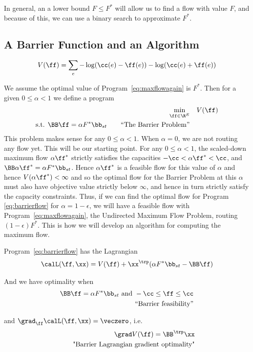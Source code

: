 In general, an a lower
bound $F \leq F^*$ will allow us to find a flow with value $F$, and
because of this, we can use a binary search to approximate $F^*$.

\subsection{A Barrier Function and an Algorithm}
\[
V(\ff) = \sum_e -\log(\cc(e)-\ff(e))  -\log(\cc(e)+\ff(e)) 
\]

We assume the optimal value of Program~\eqref{eq:maxflowagain} is $F^*$.
Then for a given $0 \leq \alpha < 1$ we define a program
\begin{align}
   \label{eq:barrierflow}
\min_{\ff \in \R^E} & \quad  V(\ff)\\
\textrm{s.t. }  \BB\ff= \alpha F^* \bb_{st}
  \tag*{``The Barrier Problem''}
\end{align}
This problem makes sense for any $0 \leq \alpha < 1$.
When $\alpha = 0$, we are not routing any flow yet. This will be our
starting point.
For any $0 \leq \alpha < 1$, the scaled-down maximum
flow $\alpha\ff^*$ strictly satisfies the capacities $ -\cc < \alpha\ff^* < \cc$, and
$\BB\alpha\ff^*= \alpha F^* \bb_{st}$.
Hence $\alpha\ff^*$ is a feasible flow for this value of $\alpha$ and 
hence $V(\alpha\ff^*) < \infty$ and so the optimal flow for the
Barrier Problem at this $\alpha$ must also have objective value
strictly below $\infty$, and hence in
turn strictly satisfy the capacity constraints.
Thus, if we can find the optimal flow for Program
\eqref{eq:barrierflow} for $\alpha = 1-\epsilon$, we will have a
feasible flow with Program~\eqref{eq:maxflowagain}, the Undirected Maximum Flow Problem, routing
$(1-\epsilon)F^*$.
This is how we will develop an algorithm for computing the maximum flow.

Program~\eqref{eq:barrierflow}  has the Lagrangian
\[
\calL(\ff,\xx) = V(\ff) + \xx^{\trp}( \alpha F^* \bb_{st}  - \BB\ff   )
\]

And we have optimality when
\begin{align}
  \label{eq:barrierfeasibility}
  \BB\ff= \alpha  F^* \bb_{st}
  \text{ and }
  -\cc \leq \ff \leq \cc
  \\
  \tag*{``Barrier feasibility''}
\end{align}

and $\grad_{\ff} \calL(\ff,\xx) = \veczero$, i.e.
\begin{align}
  \label{eq:barrierlagrangegrad}
  \grad V(\ff) = \BB^{\trp} \xx
  \\
  \tag*{"Barrier Lagrangian gradient optimality"}
\end{align}

